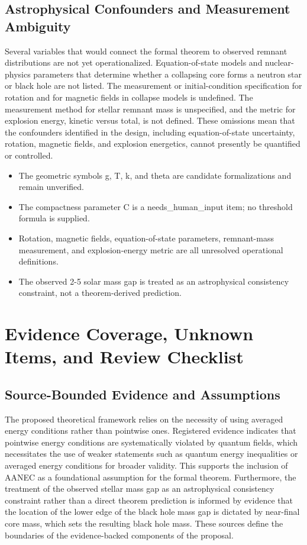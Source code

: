 \documentclass[conference]{IEEEtran}
\begin{document}
\subsection{Astrophysical Confounders and Measurement Ambiguity}
Several variables that would connect the formal theorem to observed remnant distributions are not yet operationalized. Equation-of-state models and nuclear-physics parameters that determine whether a collapsing core forms a neutron star or black hole are not listed. The measurement or initial-condition specification for rotation and for magnetic fields in collapse models is undefined. The measurement method for stellar remnant mass is unspecified, and the metric for explosion energy, kinetic versus total, is not defined. These omissions mean that the confounders identified in the design, including equation-of-state uncertainty, rotation, magnetic fields, and explosion energetics, cannot presently be quantified or controlled.

\begin{itemize}
\item The geometric symbols g, T, k, and theta are candidate formalizations and remain unverified.
\item The compactness parameter C is a needs\_human\_input item; no threshold formula is supplied.
\item Rotation, magnetic fields, equation-of-state parameters, remnant-mass measurement, and explosion-energy metric are all unresolved operational definitions.
\item The observed 2-5 solar mass gap is treated as an astrophysical consistency constraint, not a theorem-derived prediction.
\end{itemize}

\section{Evidence Coverage, Unknown Items, and Review Checklist}
\subsection{Source-Bounded Evidence and Assumptions}
The proposed theoretical framework relies on the necessity of using averaged energy conditions rather than pointwise ones. Registered evidence indicates that pointwise energy conditions are systematically violated by quantum fields, which necessitates the use of weaker statements such as quantum energy inequalities or averaged energy conditions for broader validity. This supports the inclusion of AANEC as a foundational assumption for the formal theorem. Furthermore, the treatment of the observed stellar mass gap as an astrophysical consistency constraint rather than a direct theorem prediction is informed by evidence that the location of the lower edge of the black hole mass gap is dictated by near-final core mass, which sets the resulting black hole mass. These sources define the boundaries of the evidence-backed components of the proposal.~\cite{cite_0ed84243cf171bc4,cite_7a407c865faafd11}
\end{document}
